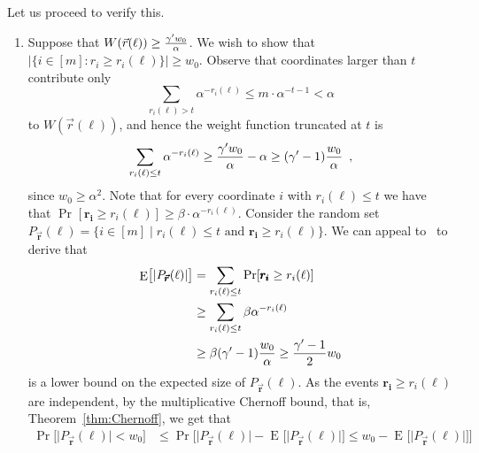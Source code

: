 \documentclass{theoretics}
\providecommand{\abs}[1]{\lvert#1\rvert}
\DeclareMathOperator{\Expop}{E}
\newcommand{\Prob}[2][]{\Pr_{#1} \bigl[ #2 \bigr]}
\newcommand{\prob}[2][]{\Pr_{#1} [ #2 ]}
\newcommand{\Expectation}[2][]{\Expop_{#1} \bigl[ #2 \bigr]}
\newcommand{\set}[1]{\{ #1 \}}
\newcommand{\setdescr}[3][\mid]{\set{ #2 #1 #3 }}
\newcommand{\setsize}[1]{\lvert#1\rvert}
\newcommand{\eqcomma}{\enspace ,}
\newcommand{\refthm}[1]{Theorem~\ref{#1}}
\newcommand{\cgammap}{\ensuremath \gamma'}
\newcommand{\indexvec}{\ell}
\newcommand{\ri}[1]{r_{#1}}
\newcommand{\riof}[2]{r_{#2}(#1)}
\newcommand{\vecr}{\vec{r}}
\newcommand{\vecrof}[1]{\vec{r}(#1)}
\newcommand{\limval}{t}
\newcommand{\vecrb}{\pmb{\vecr}}
\newcommand{\rbi}[1]{\pmb{r_#1}}
\newcommand{\goodset}[2][\vecrb]{P_{#1}(#2)}
\numberwithin{equation}{section}
\begin{document}
{Let us  proceed to verify this.
  \begin{enumerate}
  \item 
    Suppose that 
    $W(\vecrof{\indexvec}) \ge \frac{ \cgammap w_0}{ \alpha}$. 
    We wish to show     that 
    $\setsize{ \setdescr[:]{ i \in [m] }{ \ri{i} \ge \riof{\indexvec}{i} } }
    \ge w_0$.
    Observe that 
    coordinates larger than $\limval$ contribute only
    \begin{equation}
      \sum_{\riof{\indexvec}{i} > \limval}{\alpha^{-\riof{\indexvec}{i}}} \le 
      m \cdot \alpha^{-\limval-1} < \alpha
    \end{equation}
to $W(\vecrof{\indexvec})$,
    and hence the weight function  truncated at $\limval$ is
    \begin{equation}
      \label{eq:truncated-weight}
      \sum_{\riof{\indexvec}{i} \le \limval} { \alpha^{-\riof{\indexvec}{i}} } \ge 
      \frac{ \cgammap w_0}{ \alpha } - \alpha \ge (\cgammap - 1)\frac{ w_0}{ \alpha } \eqcomma
  \end{equation}
  since $ w_0 \geq \alpha^2$.
  Note that for every coordinate $i$ with $\riof{\indexvec}{i} \le \limval$
  we have that 
  $\prob{\rbi{i} \ge \riof{\indexvec}{i}} \ge \beta \cdot \alpha^{-\riof{\indexvec}{i}}$.
  Consider the 
  random
  set
  $\goodset{\indexvec} = \set{ i \in [m] \mid 
    \riof{\indexvec}{i} \le \limval \text{ and } \rbi{i} \ge \riof{\indexvec}{i} }$. 
  We can appeal to~
  to derive  that 
\begin{align}
  \Expectation{ \setsize{ \goodset{\indexvec} } } 
  &=
  \sum_{\riof{\indexvec}{i} \le \limval}
  \prob{\rbi{i} \ge \riof{\indexvec}{i}}\nonumber\\
  &\geq 
  \sum_{\riof{\indexvec}{i} \le \limval}
  \beta
  { \alpha^{-\riof{\indexvec}{i}} } \nonumber\\
  &\geq
  \beta (\cgammap - 1) \frac{ w_0}{ \alpha }
  \geq
  \frac{\cgammap - 1}{2} w_0 
\end{align}
is  a lower bound  on the expected size of $\goodset{\indexvec}$.
As the events $\rbi{i} \ge \riof{\indexvec}{i}$ are independent, by
the multiplicative Chernoff bound, that is, \refthm{thm:Chernoff}, we
get that
\begin{subequations}
\begin{align}
  \Prob{\abs{ \goodset{\indexvec} } < w_0} 
  &\le
  \Prob{ \setsize{ \goodset{\indexvec} } - 
  \Expectation{ \setsize{ \goodset{\indexvec} } } \le w_0  - \Expectation{ \setsize{ \goodset{\indexvec} } } }\\

\end{align}
\end{subequations}
\end{enumerate}}
\end{document}
